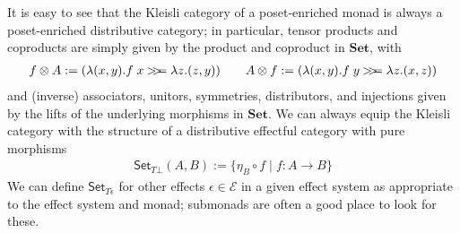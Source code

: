 \documentclass[acmsmall,screen,review]{acmart}
\newcommand{\mc}[1]{\ensuremath{\mathcal{#1}}}
\newcommand{\mb}[1]{\ensuremath{\mathbf{#1}}}
\newcommand{\ms}[1]{\ensuremath{\mathsf{#1}}}
\newcommand{\obind}{\mathbin{>\!\!>\mkern-6.7mu=}}
\newcommand{\mbind}[3]{#2 \obind_{#1} #3}
\begin{document}
It is easy to see that the Kleisli category of a poset-enriched monad is
always a poset-enriched distributive category; in particular, tensor products and coproducts are
simply given by the product and coproduct in $\mb{Set}$, with
\begin{gather*}
  f \otimes A := (\lambda (x, y) . \mbind{}{f\;x}{\lambda z . (z, y)}) \qquad
  A \otimes f := (\lambda (x, y) . \mbind{}{f\;y}{\lambda z . (x, z)}) 
\end{gather*}
and (inverse) associators, unitors, symmetries, distributors, and injections given by the lifts of
the underlying morphisms in $\mb{Set}$. We can always equip the Kleisli category with the structure
of a distributive effectful category with pure morphisms
\begin{align*}
  \ms{Set}_{T\bot}(A, B) := \{\eta_B \circ f \mid f : A \to B\}
\end{align*}
We can define $\ms{Set}_{T\epsilon}$ for other effects $\epsilon \in \mc{E}$ in a given effect
system as appropriate to the effect system and monad; submonads are often a good place to look for
these.
\end{document}
